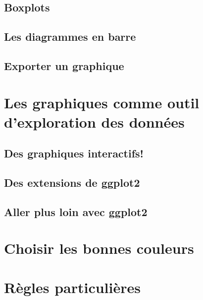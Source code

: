 \documentclass[]{book}
\begin{document}
\hypertarget{boxplots}{%
\subsection{Boxplots}\label{boxplots}}

\hypertarget{les-diagrammes-en-barre}{%
\subsection{Les diagrammes en barre}\label{les-diagrammes-en-barre}}

\hypertarget{exporter-un-graphique}{%
\subsection{Exporter un graphique}\label{exporter-un-graphique}}

\hypertarget{les-graphiques-comme-outil-dexploration-des-donnuxe9es}{%
\section{Les graphiques comme outil d'exploration des
données}\label{les-graphiques-comme-outil-dexploration-des-donnuxe9es}}

\hypertarget{des-graphiques-interactifs}{%
\subsection{Des graphiques
interactifs!}\label{des-graphiques-interactifs}}

\hypertarget{des-extensions-de-ggplot2}{%
\subsection{Des extensions de ggplot2}\label{des-extensions-de-ggplot2}}

\hypertarget{aller-plus-loin-avec-ggplot2}{%
\subsection{Aller plus loin avec
ggplot2}\label{aller-plus-loin-avec-ggplot2}}

\hypertarget{choisir-les-bonnes-couleurs}{%
\section{Choisir les bonnes
couleurs}\label{choisir-les-bonnes-couleurs}}

\hypertarget{ruxe8gles-particuliuxe8res}{%
\section{Règles particulières}\label{ruxe8gles-particuliuxe8res}}
\end{document}
